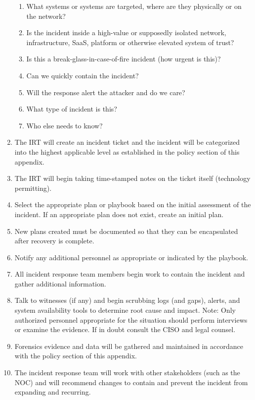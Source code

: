 \documentclass[../main.tex]{subfiles}
\begin{document}
\begin{enumerate}
\begin{enumerate}
        \item What systems or systems are targeted, where are they physically or on the network?
        \item Is the incident inside a high-value or supposedly isolated network, infrastructure, SaaS, platform or otherwise elevated system of trust?
        \item Is this a break-glass-in-case-of-fire incident (how urgent is this)?
        \item Can we quickly contain the incident?
        \item Will the response alert the attacker and do we care?
        \item What type of incident is this?
        \item Who else needs to know?
    \end{enumerate}
    \item The IRT will create an incident ticket and the incident will be categorized into the highest applicable level as established in the policy section
    of this appendix.
    \item The IRT will begin taking time-stamped notes on the ticket itself (technology permitting).
    \item Select the appropriate plan or playbook based on the initial assessment of the incident. If an appropriate plan does not exist, create an initial plan.
    \item New plans created must be documented so that they can be encapsulated after recovery is complete.
    \item Notify any additional personnel as appropriate or indicated by the playbook.
    \item All incident response team members begin work to contain the incident and gather additional information.
    \item Talk to witnesses (if any) and begin scrubbing logs (and gaps), alerts, and system availability tools to determine root cause and impact.
    Note: Only authorized personnel appropriate for the situation should perform interviews or examine the evidence. If in doubt consult the CISO and legal counsel.
    \item Forensics evidence and data will be gathered and maintained in accordance with the policy section of this appendix.
    \item The incident response team will work with other stakeholders (such as the NOC) and will recommend changes to contain and prevent the incident
    from expanding and recurring.

\end{enumerate}
\end{document}
